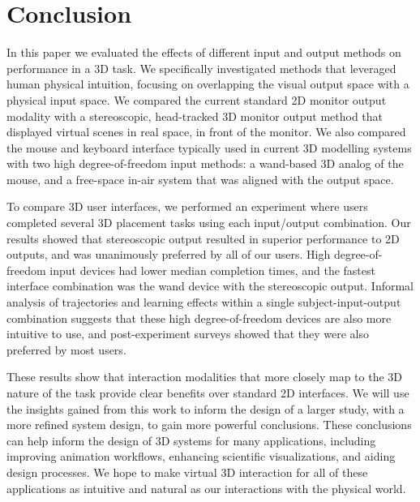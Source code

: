 \section{Conclusion}\label{sec:conclusion}
In this paper we evaluated the effects of different input and output methods on
performance in a 3D task. We specifically investigated methods that leveraged
human physical intuition, focusing on overlapping the visual output space with
a physical input space.  We compared the current standard 2D monitor output
modality with a stereoscopic, head-tracked 3D monitor output method that
displayed virtual scenes in real space, in front of the monitor. We also
compared the mouse and keyboard interface typically used in current 3D modelling
systems with two high degree-of-freedom input methods: a wand-based 3D analog of
the mouse, and a free-space in-air system that was aligned with the output
space.

To compare 3D user interfaces, we performed an experiment where users completed
several 3D placement tasks using each input/output combination. Our results
showed that stereoscopic output resulted in superior performance to 2D outputs,
and was unanimously preferred by all of our users. High degree-of-freedom input
devices had lower median completion times, and the fastest interface combination
was the wand device with the stereoscopic output. Informal analysis of
trajectories and learning effects within a single subject-input-output
combination suggests that these high degree-of-freedom devices are also more
intuitive to use, and post-experiment surveys showed that they were also
preferred by most users.

These results show that interaction modalities that more closely map to the
3D nature of the task provide clear benefits over standard 2D interfaces. We
will use the insights gained from this work to inform the design of a larger
study, with a more refined system design, to gain more powerful conclusions.
These conclusions can help inform the design of 3D systems for many
applications, including improving animation workflows, enhancing scientific
visualizations, and aiding design processes. We hope to make virtual 3D
interaction for all of these applications as intuitive and natural as
our interactions with the physical world.
